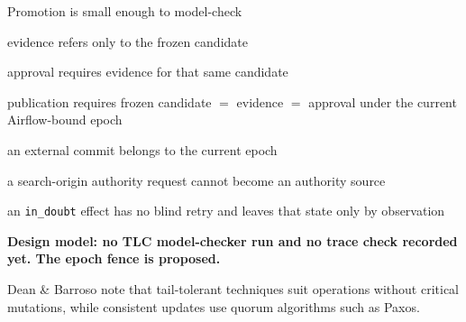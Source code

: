 \begin{frame}[t]{\ev{\tagP\,\tagO}Promotion is small enough to model-check}
\vspace{-.15cm}
{\small
\begin{ticks}
\item evidence refers only to the frozen candidate
\item approval requires evidence for that same candidate
\item publication requires frozen candidate $=$ evidence $=$ approval under the current Airflow-bound epoch
\item an external commit belongs to the current epoch
\item a search-origin authority request cannot become an authority source
\item an \texttt{in\_doubt} effect has no blind retry and leaves that state only by observation
\end{ticks}\par}
\vspace{.05cm}
{\small\color{Rust}\bfseries Design model: no TLC model-checker run and no trace check recorded yet. The epoch fence is proposed.\par}
\vspace{.1cm}
\colorbox{Pale}{\parbox{\dimexpr\textwidth-2\fboxsep\relax}{\footnotesize Dean \& Barroso note that tail-tolerant techniques suit operations without critical mutations, while consistent updates use quorum algorithms such as Paxos.}}
\end{frame}
